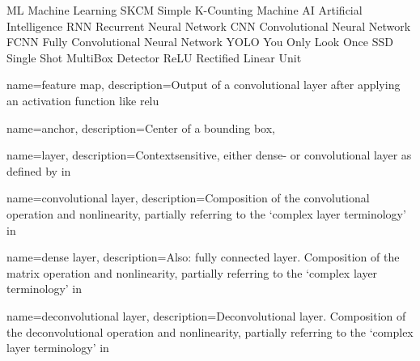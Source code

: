 
 {ML} {Machine Learning}
 {SKCM} {Simple K-Counting Machine}
 {AI} {Artificial Intelligence}
 {RNN} {Recurrent Neural Network}
 {CNN} {Convolutional Neural Network}
 {FCNN} {Fully Convolutional Neural Network}
 {YOLO} {You Only Look Once}
 {SSD} {Single Shot MultiBox Detector}
 {ReLU} {Rectified Linear Unit}



 {
    name={feature map},
    description={Output of a convolutional layer after applying an activation function like \gls{relu}}
}

 {
    name={anchor},
    description={Center of a bounding box},
}

 {
    name={layer},
    description={Contextsensitive, either dense- or \gls{convolutional layer} 
    as defined by in}}

 {
    name={convolutional layer},
    description={Composition of the convolutional operation and nonlinearity, 
    partially referring to the `complex layer terminology' 
    in~\cite[341]{IanGoodfellow.2016}}
}

 {
    name={dense layer},
    description={Also: fully connected layer. Composition of the matrix operation and nonlinearity, partially referring to the `complex layer terminology' 
    in~\cite[341]{IanGoodfellow.2016}} 
}

 {
    name={deconvolutional layer},
    description={Deconvolutional layer. Composition of the deconvolutional 
    operation and nonlinearity, partially referring to the `complex layer 
    terminology' 
    in~\cite[341]{IanGoodfellow.2016}} 
}
